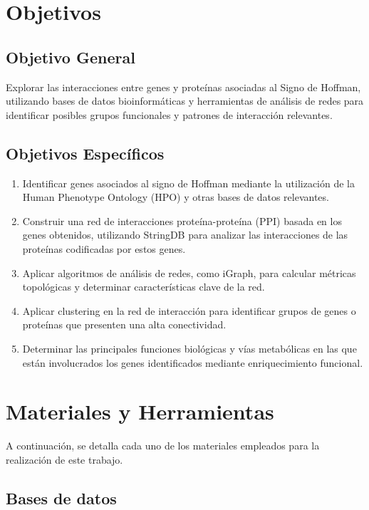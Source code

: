 \section{Objetivos}
\subsection{Objetivo General}

Explorar las interacciones entre genes y proteínas asociadas al Signo de Hoffman, utilizando bases de datos bioinformáticas y herramientas de análisis de redes para identificar posibles grupos funcionales y patrones de interacción relevantes.

\subsection{Objetivos Específicos}
\begin{enumerate}
	\item Identificar genes asociados al signo de Hoffman mediante la utilización de la Human Phenotype Ontology (HPO) y otras bases de datos relevantes.
	\item Construir una red de interacciones proteína-proteína (PPI) basada en los genes obtenidos, utilizando StringDB para analizar las interacciones de las proteínas codificadas por estos genes.
	\item Aplicar algoritmos de análisis de redes, como iGraph, para calcular métricas topológicas y determinar características clave de la red.
	\item Aplicar clustering en la red de interacción para identificar grupos de genes o proteínas que presenten una alta conectividad.
	\item Determinar las principales funciones biológicas y vías metabólicas en las que están involucrados los genes identificados mediante enriquecimiento funcional.
\end{enumerate}

\section{Materiales y Herramientas}

A continuación, se detalla cada uno de los materiales empleados para la realización de este trabajo.

\subsection{Bases de datos}


